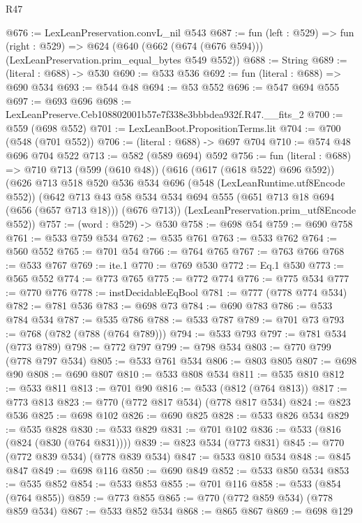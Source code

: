 \begin{lexlean}{R47}
\begin{coremodule}
@676 := LexLeanPreservation.convL_nil @543
@687 := fun (left : @529) =>
  fun (right : @529) =>
  @624 (@640 (@662 (@674 (@676 @594))) (LexLeanPreservation.prim_equal_bytes @549 @552))
@688 := String
@689 := (literal : @688) -> @530
@690 := @533 @536
@692 := fun (literal : @688) => @690 @534
@693 := @544 @48
@694 := @53 @552
@696 := @547 @694 @555
@697 := @693 @696
@698 := LexLeanPreserve.Ceb108802001b57e7f338e3bbbdea932f.R47.__fits_2
@700 := @559 (@698 @552)
@701 := LexLeanBoot.PropositionTerms.lit
@704 := @700 (@548 (@701 @552))
@706 := (literal : @688) -> @697 @704
@710 := @574 @48 @696 @704 @522
@713 := @582 (@589 @694) @592
@756 := fun (literal : @688) =>
  @710
    @713
    (@599 (@610 @48))
    (@616 (@617 (@618 @522) @696 @592))
    (@626
      @713
      @518
      @520
      @536
      @534
      @696
      (@548 (LexLeanRuntime.utf8Encode @552))
      (@642
        @713
        @43
        @58
        @534
        @534
        @694
        @555
        (@651 @713 @18 @694 (@656 (@657 @713 @18)))
        (@676 @713))
      (LexLeanPreservation.prim_utf8Encode @552))
@757 := (word : @529) -> @530
@758 := @698 @54
@759 := @690 @758
@761 := @533 @759 @534
@762 := @535 @761
@763 := @533 @762
@764 := @560 @552
@765 := @701 @54
@766 := @764 @765
@767 := @763 @766
@768 := @533 @767
@769 := ite.{1}
@770 := @769 @530
@772 := Eq.{1} @530
@773 := @565 @552
@774 := @773 @765
@775 := @772 @774
@776 := @775 @534
@777 := @770 @776
@778 := instDecidableEqBool
@781 := @777 (@778 @774 @534)
@782 := @781 @536
@783 := @698 @73
@784 := @690 @783
@786 := @533 @784 @534
@787 := @535 @786
@788 := @533 @787
@789 := @701 @73
@793 := @768 (@782 (@788 (@764 @789)))
@794 := @533 @793
@797 := @781 @534 (@773 @789)
@798 := @772 @797
@799 := @798 @534
@803 := @770 @799 (@778 @797 @534)
@805 := @533 @761 @534
@806 := @803 @805
@807 := @698 @90
@808 := @690 @807
@810 := @533 @808 @534
@811 := @535 @810
@812 := @533 @811
@813 := @701 @90
@816 := @533 (@812 (@764 @813))
@817 := @773 @813
@823 := @770 (@772 @817 @534) (@778 @817 @534)
@824 := @823 @536
@825 := @698 @102
@826 := @690 @825
@828 := @533 @826 @534
@829 := @535 @828
@830 := @533 @829
@831 := @701 @102
@836 := @533 (@816 (@824 (@830 (@764 @831))))
@839 := @823 @534 (@773 @831)
@845 := @770 (@772 @839 @534) (@778 @839 @534)
@847 := @533 @810 @534
@848 := @845 @847
@849 := @698 @116
@850 := @690 @849
@852 := @533 @850 @534
@853 := @535 @852
@854 := @533 @853
@855 := @701 @116
@858 := @533 (@854 (@764 @855))
@859 := @773 @855
@865 := @770 (@772 @859 @534) (@778 @859 @534)
@867 := @533 @852 @534
@868 := @865 @867
@869 := @698 @129

\end{coremodule}
\end{lexlean}
